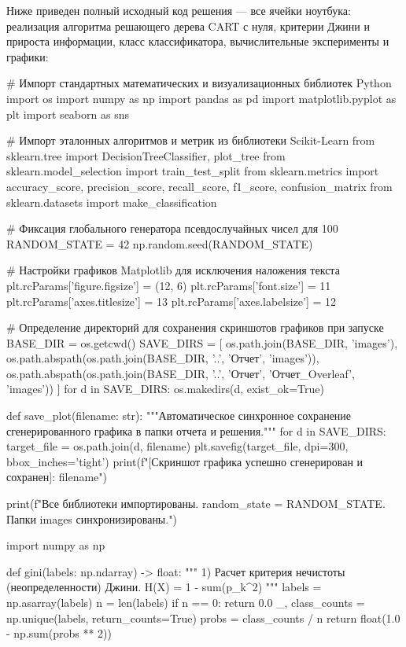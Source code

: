 \documentclass[14pt,a4paper]{extarticle}
\begin{document}
Ниже приведен полный исходный код решения — все ячейки ноутбука: реализация алгоритма решающего дерева CART с нуля, критерии Джини и прироста информации, класс классификатора, вычислительные эксперименты и графики:

\begin{CodeListing}
# Импорт стандартных математических и визуализационных библиотек Python
import os
import numpy as np
import pandas as pd
import matplotlib.pyplot as plt
import seaborn as sns

# Импорт эталонных алгоритмов и метрик из библиотеки Scikit-Learn
from sklearn.tree import DecisionTreeClassifier, plot_tree
from sklearn.model_selection import train_test_split
from sklearn.metrics import accuracy_score, precision_score, recall_score, f1_score, confusion_matrix
from sklearn.datasets import make_classification

# Фиксация глобального генератора псевдослучайных чисел для 100%
RANDOM_STATE = 42
np.random.seed(RANDOM_STATE)

# Настройки графиков Matplotlib для исключения наложения текста
plt.rcParams['figure.figsize'] = (12, 6)
plt.rcParams['font.size'] = 11
plt.rcParams['axes.titlesize'] = 13
plt.rcParams['axes.labelsize'] = 12

# Определение директорий для сохранения скриншотов графиков при запуске
BASE_DIR = os.getcwd()
SAVE_DIRS = [
    os.path.join(BASE_DIR, 'images'),
    os.path.abspath(os.path.join(BASE_DIR, '..', 'Отчет', 'images')),
    os.path.abspath(os.path.join(BASE_DIR, '..', 'Отчет', 'Отчет_Overleaf', 'images'))
]
for d in SAVE_DIRS:
    os.makedirs(d, exist_ok=True)

def save_plot(filename: str):
    """Автоматическое синхронное сохранение сгенерированного графика в папки отчета и решения."""
    for d in SAVE_DIRS:
        target_file = os.path.join(d, filename)
        plt.savefig(target_file, dpi=300, bbox_inches='tight')
    print(f"[Скриншот графика успешно сгенерирован и сохранен]: {filename}")

print(f"Все библиотеки импортированы. random_state = {RANDOM_STATE}. Папки images синхронизированы.")

import numpy as np

def gini(labels: np.ndarray) -> float:
    """
    1) Расчет критерия нечистоты (неопределенности) Джини.
    H(X) = 1 - sum(p_k^2)
    """
    labels = np.asarray(labels)
    n = len(labels)
    if n == 0:
        return 0.0
    _, class_counts = np.unique(labels, return_counts=True)
    probs = class_counts / n
    return float(1.0 - np.sum(probs ** 2))



\end{CodeListing}
\end{document}
